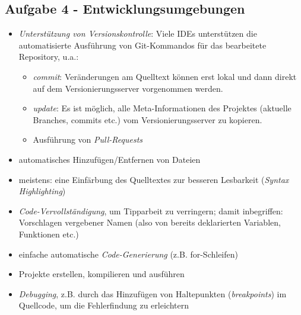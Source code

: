 \subsection{Aufgabe 4 - Entwicklungsumgebungen}
\begin{itemize}
	\item \emph{Unterstützung von Versionskontrolle}: Viele IDEs unterstützen die automatisierte Ausführung von Git-Kommandos für das bearbeitete Repository, u.a.:
	\begin{itemize}
    	\item \emph{commit}: Veränderungen am Quelltext können erst lokal und dann direkt auf dem Versionierungsserver vorgenommen werden.
    	\item \emph{update}: Es ist möglich, alle Meta-Informationen des Projektes (aktuelle Branches, commits etc.) vom Versionierungsserver zu kopieren.
    	\item Ausführung von \emph{Pull-Requests}
	\end{itemize}
	
	\item automatisches Hinzufügen/Entfernen von Dateien
	
	\item meistens: eine Einfärbung des Quelltextes zur besseren Lesbarkeit (\emph{Syntax Highlighting})
	
	\item \emph{Code-Vervollständigung}, um Tipparbeit zu verringern; damit inbegriffen: Vorschlagen vergebener Namen (also von bereits deklarierten Variablen, Funktionen etc.)
	
	\item einfache automatische \emph{Code-Generierung} (z.B. for-Schleifen)
	
	\item Projekte erstellen, kompilieren und ausführen
	
	\item \emph{Debugging}, z.B. durch das Hinzufügen von Haltepunkten (\emph{breakpoints}) im Quellcode, um die Fehlerfindung zu erleichtern
\end{itemize}

